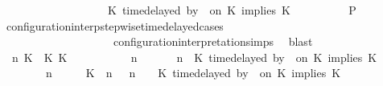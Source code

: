\begin{isabellebody}
\ \ \ \ \ \ \ \ \ \ \ \ \ \ \ \ {\isasymturnstile}\ {\isasymPsi}\ {\isasymtriangleright}\ {\isacharparenleft}{\isacharparenleft}K\ time{\isacharminus}delayed\ by\ {\isasymdelta}{\isasymtau}\ on\ K\ implies\ K\ {\isacharhash}\ {\isasymPhi}{\isacharparenright}{\isacharparenright}{\isacartoucheclose}\isanewline
\ \ \ \ \ \ \isamarkupfalse%
\ {\isacharquery}P\ \isamarkupfalse%
\ configuration{\isacharunderscore}interp{\isacharunderscore}stepwise{\isacharunderscore}timedelayed{\isacharunderscore}cases\isanewline
\ \ \ \ \ \ \ \ \ \ \ \ \ \ \ \ \ \ \ \ configuration{\isacharunderscore}interpretation{\isachardot}simps\ \isamarkupfalse%
\ blast\isanewline
\ \ \ \ \isamarkupfalse%
\isanewline
\ \ \ \ \ \ \isamarkupfalse%
\ {\isasymGamma}\ n\ K\ {\isasymdelta}{\isasymtau}\ K\ K\ {\isasymPsi}\ {\isasymPhi}\isanewline
\ \ \ \ \ \ \isamarkupfalse%
\ {\isacartoucheopen}{\isacharparenleft}{\isasymGamma}\ n\ {\isasymturnstile}\ {\isasymPsi}\ {\isasymtriangleright}\ {\isasymPhi}\ {\isacharequal}\ {\isacharparenleft}{\isasymGamma}{\isacharcomma}\ n\ {\isasymturnstile}\ {\isacharparenleft}K\ time{\isacharminus}delayed{\isasymsharp}\ by\ {\isasymdelta}{\isasymtau}\ on\ K\ implies\ K\ {\isacharhash}\ {\isasymPsi}\ {\isasymtriangleright}\ {\isasymPhi}{\isacharparenright}{\isacartoucheclose}\isanewline
\ \ \ \ \ \ \ {\isacartoucheopen}{\isacharparenleft}{\isasymGamma}\ n\ {\isasymturnstile}\ {\isasymPsi}\ {\isasymtriangleright}\ {\isasymPhi}\ {\isacharequal}\ {\isacharparenleft}{\isacharparenleft}{\isacharparenleft}K\ {\isasymnot}{\isasymUp}\ n{\isacharparenright}\ {\isacharhash}\ {\isasymGamma}{\isacharparenright}{\isacharcomma}\ n\ {\isasymturnstile}\ {\isasymPsi}\ {\isasymtriangleright}\ {\isacharparenleft}{\isacharparenleft}K\ time{\isacharminus}delayed{\isasymsharp}\ by\ {\isasymdelta}{\isasymtau}\ on\ K\ implies\ K\ {\isacharhash}\ {\isasymPhi}{\isacharparenright}{\isacharparenright}{\isacartoucheclose}\isanewline

\end{isabellebody}
